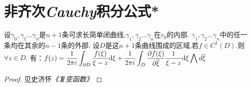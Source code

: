 \section{非齐次\emph{Cauchy}积分公式*}
\begin{mypro}
	设$\gamma_0,\gamma_1\dots \gamma_n$是$n+1$条可求长简单闭曲线,$\gamma_1,\gamma_2\dots \gamma_n$在$r_0$的内部.
	$\gamma_1,\gamma_2\dots \gamma_n$中的任一条均在其余的$n-1$条的外部.
	设$D$是这$n+1$条曲线围成的区域,若$f\in C^1(D)$.则$\forall z\in D$.
	有：$\displaystyle{f(z)=\frac{1}{2\pi i}\int_{\partial D}\frac{f(\xi)}{\xi-z}\mathrm{d}\xi
		+\frac{1}{2\pi i}\int_D\frac{\partial f(\xi)}{\partial\overline{\xi}}\frac{1}{\xi-z}\mathrm{d}\xi\bigwedge d\overline{\xi}}$
\end{mypro}
\begin{proof}
	见史济怀\emph{《复变函数》}
\end{proof}